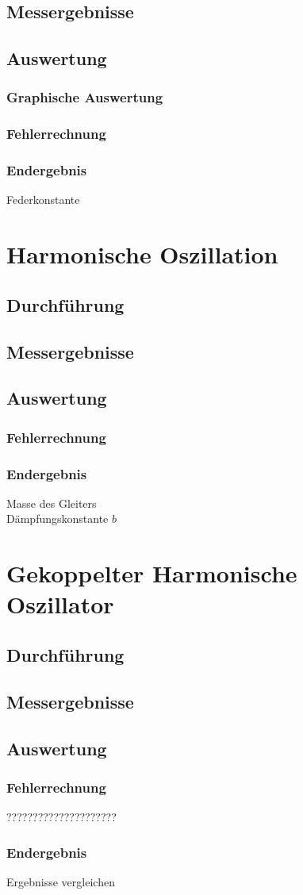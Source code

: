 \documentclass{article}
\begin{document}
        \subsection{Messergebnisse}
        \subsection{Auswertung}
            \subsubsection{Graphische Auswertung}
            \subsubsection{Fehlerrechnung} 
            \subsubsection{Endergebnis}
            Federkonstante

    \section{Harmonische Oszillation}
        \subsection{Durchführung}
        \subsection{Messergebnisse}
        \subsection{Auswertung}
            \subsubsection{Fehlerrechnung} 
            \subsubsection{Endergebnis}
                Masse des Gleiters \\
                Dämpfungskonstante \(b\)

    \section{Gekoppelter Harmonische Oszillator}
        \subsection{Durchführung}
        \subsection{Messergebnisse}
        \subsection{Auswertung}
            \subsubsection{Fehlerrechnung}
            ?????????????????????
            \subsubsection{Endergebnis}
                Ergebnisse vergleichen
\end{document}
